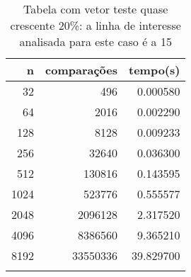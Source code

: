 \begin{table}[ht]
\centering
\begin{tabular}{rrr} \toprule
        n &    comparações &       tempo(s) \\ \midrule
      32  &            496 &      0.000580 \\
      64  &           2016 &      0.002290 \\
     128  &           8128 &      0.009233 \\
     256  &          32640 &      0.036300 \\
     512  &         130816 &      0.143595 \\
    1024  &         523776 &      0.555577 \\
    2048  &        2096128 &      2.317520 \\
    4096  &        8386560 &      9.365210 \\
    8192  &       33550336 &     39.829700 \\
\bottomrule\addlinespace
\end{tabular}
\caption{Tabela com vetor teste quase crescente 20\%: a linha de interesse analisada para este caso é a 15}
\label{tab:bolhaQuaseCresc20}
\end{table}
